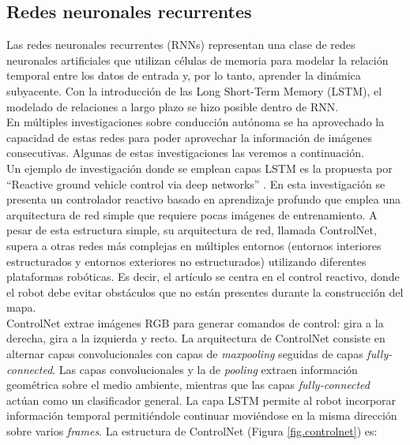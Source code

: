 \subsection{Redes neuronales recurrentes}


Las redes neuronales recurrentes (RNNs) representan una clase de redes neuronales artificiales que utilizan células de memoria para modelar la relación temporal entre los datos de entrada y, por lo tanto, aprender la dinámica subyacente. Con la introducción de las Long Short-Term Memory (LSTM), el modelado de relaciones a largo plazo se hizo posible dentro de RNN.\\

En múltiples investigaciones sobre conducción autónoma se ha aprovechado la capacidad de estas redes para poder aprovechar la información de imágenes consecutivas. Algunas de estas investigaciones las veremos a continuación.\\

Un ejemplo de investigación donde se emplean capas LSTM es la propuesta por ``Reactive  ground  vehicle  control  via  deep networks'' \cite{reactive-ground}. En esta investigación se presenta un controlador reactivo basado en aprendizaje profundo que emplea una arquitectura de red simple que requiere pocas imágenes de entrenamiento. A pesar de esta estructura simple, su arquitectura de red, llamada ControlNet, supera a otras redes más complejas en múltiples entornos (entornos interiores estructurados y entornos exteriores no estructurados) utilizando diferentes plataformas robóticas. Es decir, el artículo se centra en el control reactivo, donde el robot debe evitar obstáculos que no están presentes durante la construcción del mapa.\\

ControlNet extrae imágenes RGB para generar comandos de control: gira a la derecha, gira a la izquierda y recto. La arquitectura de ControlNet consiste en alternar capas convolucionales con capas de \textit{maxpooling} seguidas de capas \textit{fully-connected}. Las capas convolucionales y la de \textit{pooling} extraen información geométrica sobre el medio ambiente, mientras que las capas \textit{fully-connected} actúan como un clasificador general. La capa LSTM permite al robot incorporar información temporal permitiéndole continuar moviéndose en la misma dirección sobre varios \textit{frames}. La estructura de ControlNet (Figura \ref{fig.controlnet}) es:

